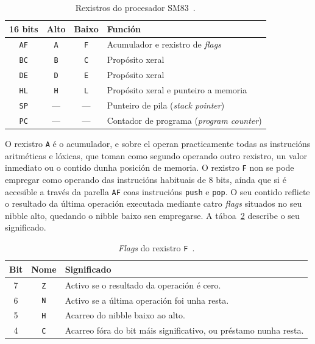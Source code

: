 \begin{table}[htbp]
  \centering
  \setlength{\tabcolsep}{5pt}
  \begin{tabular}{c|c|c|l}
  \rowcolor{udcpink!25}
  \textbf{16 bits} & \textbf{Alto} & \textbf{Baixo} & \textbf{Función} \\\hline
  \texttt{AF} & \texttt{A} & \texttt{F} & Acumulador e rexistro de \textit{flags} \\
  \texttt{BC} & \texttt{B} & \texttt{C} & Propósito xeral \\
  \texttt{DE} & \texttt{D} & \texttt{E} & Propósito xeral \\
  \texttt{HL} & \texttt{H} & \texttt{L} & Propósito xeral e punteiro a memoria \\
  \texttt{SP} & --- & --- & Punteiro de pila (\textit{stack pointer}) \\
  \texttt{PC} & --- & --- & Contador de programa (\textit{program counter}) \\
  \end{tabular}
  \caption{Rexistros do procesador SM83~\cite{pandocs}.}
  \label{tab:rexistros-cpu}
\end{table}

O rexistro \texttt{A} é o acumulador, e sobre el operan practicamente todas as instrucións
aritméticas e lóxicas, que toman como segundo operando outro rexistro, un valor inmediato ou
o contido dunha posición de memoria.
O rexistro \texttt{F} non se pode empregar como operando das instrucións habituais de 8 bits,
aínda que si é accesible a través da parella \texttt{AF} coas instrucións \texttt{push} e \texttt{pop}.
O seu contido reflicte o resultado
da última operación executada mediante catro \textit{flags} situados no seu \gls{nibble} alto,
quedando o \gls{nibble} baixo sen empregarse.
A táboa~\ref{tab:flags-cpu} describe o seu significado.

\begin{table}[htbp]
  \centering
  \begin{tabular}{c|c|>{\raggedright\arraybackslash}p{9cm}}
  \rowcolor{udcpink!25}
  \textbf{Bit} & \textbf{Nome} & \textbf{Significado} \\\hline
  7 & \texttt{Z} & Activo se o resultado da operación é cero. \\
  6 & \texttt{N} & Activo se a última operación foi unha resta. \\
  5 & \texttt{H} & Acarreo do \gls{nibble} baixo ao alto. \\
  4 & \texttt{C} & Acarreo fóra do bit máis significativo, ou préstamo nunha resta. \\
  \end{tabular}
  \caption{\textit{Flags} do rexistro \texttt{F}~\cite{pandocs}.}
  \label{tab:flags-cpu}
\end{table}

